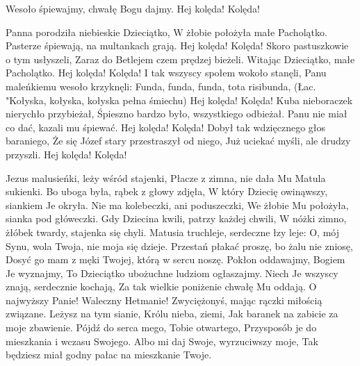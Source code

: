 \beginchorus
        Wesoło śpiewajmy, chwałę Bogu dajmy.
        Hej kolęda! Kolęda!
\endchorus

\beginverse
    Panna porodziła niebieskie Dzieciątko,
    W żłobie położyła małe Pacholątko.
\endverse		
\beginchorus
        Pasterze śpiewają, na multankach grają.
        Hej kolęda! Kolęda!	
\endchorus	
\beginverse
    Skoro pastuszkowie o tym usłyszeli,
    Zaraz do Betlejem czem prędzej bieżeli.
\endverse
\beginchorus
        Witając Dzieciątko, małe Pacholątko.
        Hej kolęda! Kolęda!
\endchorus
\beginverse
    I tak wszyscy społem wokoło stanęli,
    Panu maleńkiemu wesoło krzyknęli:
\endverse
\beginchorus
        Funda, funda, funda, tota risibunda,
        {\tiny (Łac. "Kołyska, kołyska, kołyska pełna śmiechu)}
        Hej kolęda! Kolęda!
\endchorus
\beginverse
    Kuba nieboraczek nierychło przybieżał,
    Śpieszno bardzo było, wszystkiego odbieżał.
\endverse
\beginchorus
        Panu nie miał co dać, kazali mu śpiewać.
        Hej kolęda! Kolęda!
\endchorus
\beginverse
    Dobył tak wdzięcznego głos baraniego,
    Że się Józef stary przestraszył od niego,
\endverse
\beginchorus
    Już uciekać myśli, ale drudzy przyszli.
    Hej kolęda! Kolęda!
\endchorus
\endsong






\beginverse
    Jezus malusieńki, leży wśród stajenki,
    Płacze z zimna, nie dała Mu Matula sukienki.
\endverse
\beginverse
    Bo uboga była, rąbek z głowy zdjęła,
    W który Dziecię owinąwszy, siankiem Je okryła.
\endverse
\beginverse
    Nie ma kolebeczki, ani poduszeczki,
    We żłobie Mu położyła, sianka pod główeczki.
\endverse
\beginverse
    Gdy Dziecina kwili, patrzy każdej chwili,
    W nóżki zimno, żłóbek twardy, stajenka się chyli.
\endverse
\beginverse
    Matusia truchleje, serdeczne łzy leje:
    O, mój Synu, wola Twoja, nie moja się dzieje.
\endverse
\beginverse
    Przestań płakać proszę, bo żalu nie zniosę,
    Dosyć go mam z męki Twojej, którą w sercu noszę.
\endverse
\beginverse
    Pokłon oddawajmy, Bogiem Je wyznajmy,
    To Dzieciątko ubożuchne ludziom ogłaszajmy.
\endverse
\beginverse
    Niech Je wszyscy znają, serdecznie kochają,
    Za tak wielkie poniżenie chwałę Mu oddają.
\endverse
\beginverse
    O najwyższy Panie! Waleczny Hetmanie!
    Zwyciężonyś, mając rączki miłością związane.
\endverse
\beginverse
    Leżysz na tym sianie, Królu nieba, ziemi,
    Jak baranek na zabicie za moje zbawienie.
\endverse
\beginverse
    Pójdź do serca mego, Tobie otwartego,
    Przysposób je do mieszkania i wczasu Swojego.
\endverse
\beginverse
    Albo mi daj Swoje, wyrzuciwszy moje,
    Tak będziesz miał godny pałac na mieszkanie Twoje.
\endverse
\endsong

